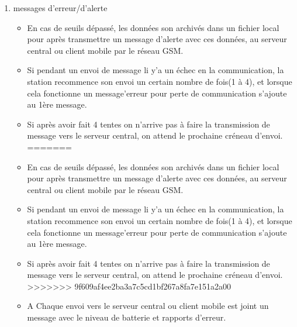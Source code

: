 \documentclass [a4paper] {report}
\begin{document}
\begin{description}
\begin{enumerate}
	\item messages d'erreur/d'alerte\\
		\begin{itemize}
<<<<<<< HEAD
		\item En cas de seuils dépassé, les données son archivés dans un fichier local pour après  transmettre
		 un message d'alerte avec ces données, au serveur central ou client mobile par le réseau GSM. \\
		\item Si pendant un envoi de message li y'a un échec en la communication, la station recommence son envoi
		 un certain nombre de fois(1 à 4), et lorsque cela fonctionne un message'erreur pour perte de communication
		  s'ajoute au 1ère message.\\
		\item Si après avoir fait 4 tentes on n'arrive pas à faire la transmission de message vers le serveur central, on
		 attend le prochaine créneau d'envoi.\\
=======
		\item En cas de seuils dépassé, les données son archivés dans un fichier local pour après  transmettre un message d'alerte avec ces données, au serveur central ou client mobile par le réseau GSM. \\
		\item Si pendant un envoi de message li y'a un échec en la communication, la station recommence son envoi un certain nombre de fois(1 à 4), et lorsque cela fonctionne un message'erreur pour perte de communication s'ajoute au 1ère message.\\
		\item Si après avoir fait 4 tentes on n'arrive pas à faire la transmission de message vers le serveur central, on attend le prochaine créneau d'envoi.\\
>>>>>>> 9f609af4ee2ba3a7c5cd1bf267a8fa7e151a2a00
		\item A Chaque envoi vers le serveur central ou client mobile est joint un message avec le niveau de batterie et rapports d'erreur.\\
		\end{itemize}\hfill\\
	\end{enumerate}


\end{description}
\end{document}
